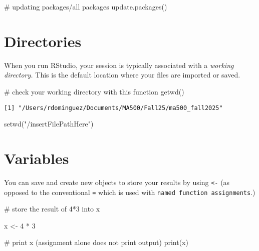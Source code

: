 \documentclass[
  letterpaper,
  DIV=11,
  numbers=noendperiod]{scrreprt}
\newenvironment{Shaded}{\begin{snugshade}}{\end{snugshade}}
\newcommand{\CommentTok}[1]{\textcolor[rgb]{0.37,0.37,0.37}{#1}}
\newcommand{\DecValTok}[1]{\textcolor[rgb]{0.68,0.00,0.00}{#1}}
\newcommand{\FunctionTok}[1]{\textcolor[rgb]{0.28,0.35,0.67}{#1}}
\newcommand{\NormalTok}[1]{\textcolor[rgb]{0.00,0.23,0.31}{#1}}
\newcommand{\OtherTok}[1]{\textcolor[rgb]{0.00,0.23,0.31}{#1}}
\newcommand{\SpecialCharTok}[1]{\textcolor[rgb]{0.37,0.37,0.37}{#1}}
\newcommand{\StringTok}[1]{\textcolor[rgb]{0.13,0.47,0.30}{#1}}
\begin{document}
\begin{Shaded}
\begin{Highlighting}[]
\CommentTok{\# updating packages/all packages}
\FunctionTok{update.packages}\NormalTok{()}
\end{Highlighting}
\end{Shaded}

\section*{Directories}\label{directories}


When you run RStudio, your session is typically associated with a
\emph{working directory.} This is the default location where your files
are imported or saved.

\begin{Shaded}
\begin{Highlighting}[]
\CommentTok{\# check your working directory with this function}
\FunctionTok{getwd}\NormalTok{()}
\end{Highlighting}
\end{Shaded}

\begin{verbatim}
[1] "/Users/rdominguez/Documents/MA500/Fall25/ma500_fall2025"
\end{verbatim}

\begin{Shaded}
\begin{Highlighting}[]
\FunctionTok{setwd}\NormalTok{(}\StringTok{"/insertFilePathHere"}\NormalTok{)}
\end{Highlighting}
\end{Shaded}

\section*{Variables}\label{variables}


You can save and create new objects to store your results by using
\texttt{\textless{}-} (as opposed to the conventional \texttt{=} which
is used with \texttt{named\ function\ assignments}.)

\begin{Shaded}
\begin{Highlighting}[]
\CommentTok{\# store the result of 4*3 into x}

\NormalTok{x }\OtherTok{\textless{}{-}} \DecValTok{4} \SpecialCharTok{*} \DecValTok{3}

\CommentTok{\# print x (assignment alone does not print output)}
\FunctionTok{print}\NormalTok{(x)}
\end{Highlighting}
\end{Shaded}
\end{document}
